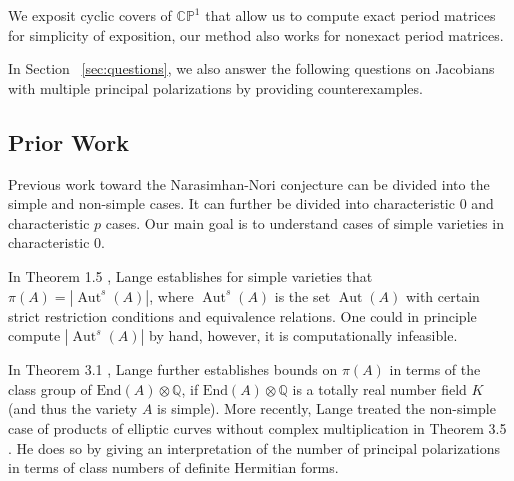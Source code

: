 \documentclass[12pt,reqno]{amsart}
\DeclareMathOperator{\Aut}{Aut}
\newcommand{\C}{\mathbb{C}}
\newcommand{\Q}{\mathbb{Q}}
\renewcommand{\P}{\mathbb{P}}
\theoremstyle{definition}
\theoremstyle{remark}
\newtheorem*{remark}{Remark}
\begin{document}
We exposit cyclic covers of $\C\P^1$ that allow us to compute exact period matrices for simplicity of exposition, our method also works for nonexact period matrices.

In Section ~\ref{sec:questions}, we also answer the following questions on Jacobians with multiple principal polarizations by providing counterexamples.

\subsection{Prior Work}
\label{sec:prior}
Previous work toward the Narasimhan-Nori conjecture can be divided into the simple and non-simple cases. %
It can further be divided into characteristic 0 and characteristic $p$ cases. Our main goal is to understand cases of simple varieties in characteristic 0. 

In Theorem 1.5 \cite{several}, Lange establishes for simple varieties that $\pi(A) = |\Aut^s(A)|$, where $\Aut^s(A)$ is the set $\Aut(A)$ with certain strict restriction conditions and equivalence relations. One could in principle compute $|\Aut^s(A)|$ by hand, however, it is computationally infeasible. 


In Theorem 3.1 \cite{several}, Lange further establishes bounds on $\pi(A)$ in terms of the class group of $\text{End}(A) \otimes \Q$, if $\text{End}(A) \otimes \Q$ is a totally real number field $K$ (and thus the variety $A$ is simple). More recently, Lange treated the non-simple case of products of elliptic curves without complex multiplication in Theorem 3.5 \cite{newlange}. He does so by giving an interpretation of the number of principal polarizations in terms of class numbers of definite Hermitian forms.

\end{document}
